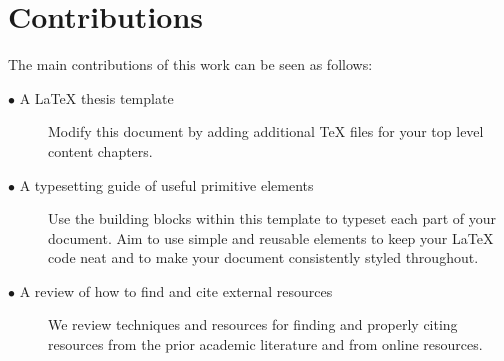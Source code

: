 	\section{Contributions} 
		\label{sec:intro_contribs} 
		
		The main contributions of this work can be seen as follows:
		
		\begin{description}	
		
			\item[$\bullet$ A LaTeX thesis template]\hfill
			
			Modify this document by adding additional TeX files for your top level content chapters. 
			
			\item[$\bullet$ A typesetting guide of useful primitive elements]\hfill
			
			Use the building blocks within this template to typeset each part of your document. Aim to use simple and reusable elements to keep your LaTeX code neat and to make your document consistently styled throughout.
			
			\item[$\bullet$ A review of how to find and cite external resources]\hfill
						
			We review techniques and resources for finding and properly citing resources from the prior academic literature and from online resources.
			
		\end{description}